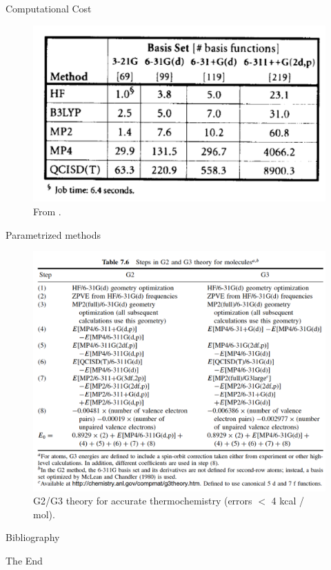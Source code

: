 \documentclass[aspectratio=169]{beamer}
\begin{document}
    \begin{frame}{Computational Cost}
        \begin{figure}
            \centering
            \includegraphics[width=0.65\linewidth]{lectures/figures/3_compute_cost.png}
            \caption{From \cite{foresmanExploringChemistryElectronic1996}.}
        \end{figure}
    \end{frame}

    \begin{frame}{Parametrized methods}
        \begin{figure}
            \centering
            \includegraphics[width=0.5\linewidth]{lectures/figures/3_G2_G3.png}
            \caption{G2/G3 theory for accurate thermochemistry (errors $<$ 4 kcal / mol).}
        \end{figure}
    \end{frame}

    \begin{frame}[allowframebreaks]{Bibliography}
        
        
    \end{frame}



    \begin{frame}
        \Huge{\centerline{The End}}
    \end{frame}
\end{document}
